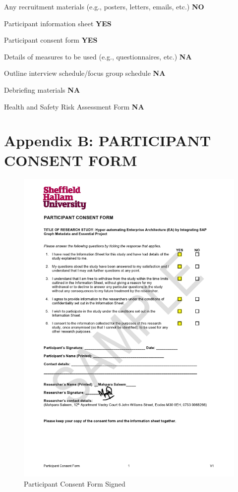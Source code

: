 \documentclass{article}
\begin{document}
Any recruitment materials (e.g., posters, letters, emails, etc.) \textbf{NO}

Participant information sheet  \textbf{YES}

Participant consent form \textbf{YES}

Details of measures to be used (e.g., questionnaires, etc.) \textbf{NA}

Outline interview schedule/focus group schedule \textbf{NA}

Debriefing materials \textbf{NA}

Health and Safety Risk Assessment Form  \textbf{NA}

\newpage

\section{Appendix B: PARTICIPANT CONSENT FORM}

\begin{figure}[ht!]
    \centering
    \includegraphics[scale=0.35]{participant-consent-form}
    \caption{Participant Consent Form Signed}
    \label{fig:participant-consent}
\end{figure}
\end{document}
